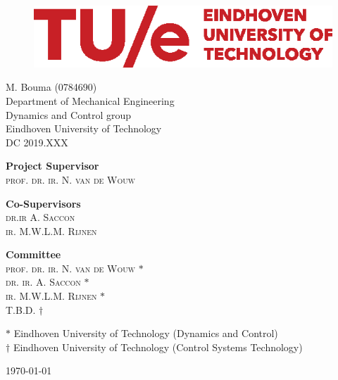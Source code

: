 \documentclass[DC2017114Bouma.tex]{subfiles}
\begin{document}
\begin{figure}[H]
\centering
\begin{minipage}{.7\textwidth}
  \includegraphics[width=1\linewidth]{TUe-logo-descriptor-line-scarlet-rgb.eps}
\end{minipage}
\end{figure}  

\begin{center}

\vspace*{20pt}
\huge{\textbf{\mytitle}}

\vspace*{30pt}
{\Large M. Bouma (0784690)}\\
\large{Department of Mechanical Engineering\\
			Dynamics and Control group\\
			Eindhoven University of Technology}\\
{\large DC 2019.XXX}

\end{center}

\vspace{3cm}

\begin{flushleft} 
	\textbf{Project Supervisor}\\
	\textsc{prof. dr. ir. N. van de Wouw}
\end{flushleft}
\vspace{.1cm}
\begin{flushleft} 
	\textbf{Co-Supervisors}\\
	\textsc{dr.ir A. Saccon}\\
	\textsc{ir. M.W.L.M. Rijnen}
\end{flushleft}
\vspace{.1cm}
\begin{flushleft} 
	\textbf{Committee}\\
	\textsc{prof. dr. ir. N. van de Wouw} $*$\\
	\textsc{dr. ir. A. Saccon} $*$\\
	\textsc{ir. M.W.L.M. Rijnen} $*$\\
	\textsc{T.B.D.} $\dagger$
\end{flushleft}
\vfill
{\small $*$ Eindhoven University of Technology (Dynamics and Control)}\\
{\small $\dagger$ Eindhoven University of Technology (Control Systems Technology)}
\bigskip

\today
\end{document}
